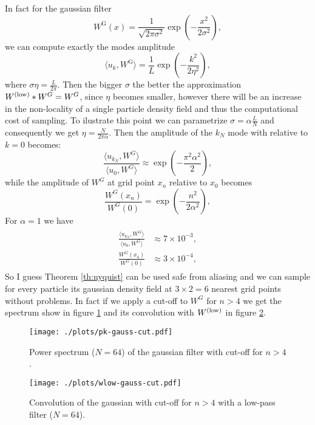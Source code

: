 In fact for the gaussian filter
\begin{equation}
    W^{\text{G}}(x) = 
    \frac{1}{\sqrt{2\pi \sigma^2}} \exp\left(-\frac{x^2}{2\sigma^2}\right),
\end{equation}
we can compute exactly the modes amplitude
\begin{equation}
    \langle u_k, W^{\text{G}} \rangle = 
    \frac{1}{L} \exp\left(-\frac{k^2}{2\eta^2}\right),
\end{equation}
where $\sigma \eta = \frac{L}{2\pi}$.
Then the bigger $\sigma$ the better the approximation 
$W^\mathrm{(low)} * W^G = W^G$, since $\eta$ becomes smaller,
however there will be an increase in the non-locality 
of a single particle density field and thus the computational
cost of sampling.
To ilustrate this point we can parametrize $\sigma = \alpha \frac{L}{N}$
and consequently we get $\eta = \frac{N}{2\pi \alpha}$.
Then the amplitude of the $k_N$ mode with relative to $k=0$
becomes:
\begin{equation}
    \frac{\langle u_{k_N}, W^G \rangle}{ \langle u_0, W^G \rangle}
    \approx \exp\left( -\frac{\pi^2 \alpha^2}{2} \right),
\end{equation}
while the amplitude of $W^G$ at grid point $x_n$ relative to $x_0$
becomes
\begin{equation}
    \frac{W^G(x_n)}{W^G(0)}
    = \exp\left( -\frac{n^2}{ 2 \alpha^2} \right),
\end{equation}
For $\alpha=1$ we have
\begin{align}
\begin{split}
    \frac{\langle u_{k_N}, W^G \rangle}{ \langle u_0, W^G \rangle} 
        &\approx 7\times 10^{-3}, \\
    \frac{W^G(x_4)}{W^G(0)} 
        &\approx 3\times 10^{-4},
\end{split}
\end{align}
So I guess Theorem \ref{th:nyquist} can be used safe from aliasing
and we can sample for every particle its gaussian density field 
at $3\times 2 =6$ nearest grid points without problems.
In fact if we apply a cut-off to $W^G$ for $n > 4$ we get the
spectrum show in figure \ref{fig:pkgausscut} and
its convolution with $W^\mathrm{(low)}$ in figure \ref{fig:wlowgausscut}.

\begin{figure}
    \centering\texttt{[image: ./plots/pk-gauss-cut.pdf]}
    \caption{Power spectrum ($N=64$) 
    of the gaussian filter with cut-off for $n>4$.}
    \label{fig:pkgausscut}
\end{figure}
\begin{figure}
    \centering\texttt{[image: ./plots/wlow-gauss-cut.pdf]}
    \caption{Convolution of the gaussian with cut-off for $n>4$ 
    with a low-pass filter ($N=64$).}
    \label{fig:wlowgausscut}
\end{figure}
